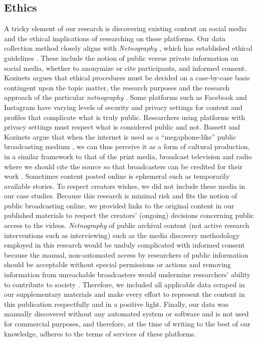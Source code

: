 \subsection{Ethics}\label{Ethics}
A tricky element of our research is discovering existing content on social media and the ethical implications of researching on these platforms. Our data collection method closely aligns with \textit{Netnography} \cite{kozinetsNetnographyEssentialGuide2019}, which has established ethical guidelines \cite{kozinetsEthics2019}. These include the notion of public versus private information on social media, whether to anonymize or cite participants, and informed consent. Kozinets argues that ethical procedures must be decided on a case-by-case basis contingent upon the topic matter, the research purposes and the research approach of the particular \textit{netnography} \cite{kozinetsNetnographyEssentialGuide2019}. Some platforms such as Facebook and Instagram have varying levels of security and privacy settings for content and profiles that complicate what is truly public. Researchers using platforms with privacy settings must respect what is considered public and not. Bassett and Kozinets argue that when the internet is used as a ``megaphone-like'' public broadcasting medium \cite{mcquarrieMegaphoneEffectTaste2013}, we can thus perceive it as a form of cultural production, in a similar framework to that of the print media, broadcast television and radio where we should cite the source so that broadcasters can be credited for their work \cite{bassettEthicsInternetResearch2002,kozinetsEthics2019}. Sometimes content posted online is ephemeral such as temporarily available stories. To respect creators wishes, we did not include these media in our case studies. Because this research is minimal risk and fits the notion of public broadcasting online, we provided links to the original content in our published materials to respect the creators' (ongoing) decisions concerning public access to the videos. \textit{Netnography} of public archival content (not active research interventions such as interviewing) such as the media discovery methodology employed in this research would be unduly complicated with informed consent because the manual, non-automated access by researchers of public information should be acceptable without special permissions or actions \cite{allenAcademicDataCollection2006} and removing information from unreachable broadcasters would undermine researchers' ability to contribute to society \cite{kozinetsEthics2019}. Therefore, we included all applicable data scraped in our supplementary materials and make every effort to represent the content in this publication respectfully and in a positive light. Finally, our data was manually discovered without any automated system or software and is not used for commercial purposes, and therefore, at the time of writing to the best of our knowledge, adheres to the terms of services of these platforms.

